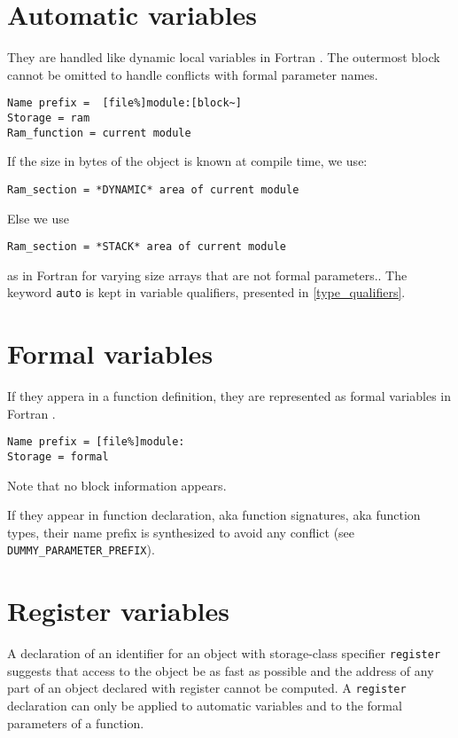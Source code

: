 \documentclass[a4paper]{report}
\begin{document}
\section{Automatic variables}

They are handled like dynamic local variables in Fortran \cite{Coel01}. 
The outermost block cannot be omitted to handle conflicts with formal parameter names. 
\begin{verbatim}
Name prefix =  [file%]module:[block~]
Storage = ram 
Ram_function = current module 
\end{verbatim}
If the size in bytes of the object is known at compile time, we use:
\begin{verbatim}
Ram_section = *DYNAMIC* area of current module
\end{verbatim}
Else we use
\begin{verbatim}
Ram_section = *STACK* area of current module
\end{verbatim}
as in Fortran for varying size arrays that are not formal parameters..
The keyword \verb/auto/ is kept in variable qualifiers, presented in
\ref{type_qualifiers}. 

\section{Formal variables}

If they appera in a function definition, they are represented as formal variables in Fortran \cite{Coel01}. 
\begin{verbatim}
Name prefix = [file%]module:
Storage = formal 
\end{verbatim}

Note that no block information appears.

If they appear in function declaration, aka function signatures, aka
 function types, their name prefix is synthesized to avoid any
 conflict (see \verb/DUMMY_PARAMETER_PREFIX/).

\section{Register variables}

A declaration of an identifier for an object with storage-class specifier
\verb/register/ suggests that access to the object be as fast as possible and 
the address of any part of an object declared with register cannot be
computed.  A \verb/register/ declaration can only be applied to automatic 
variables and to the formal parameters of a function. 
 
\end{document}
